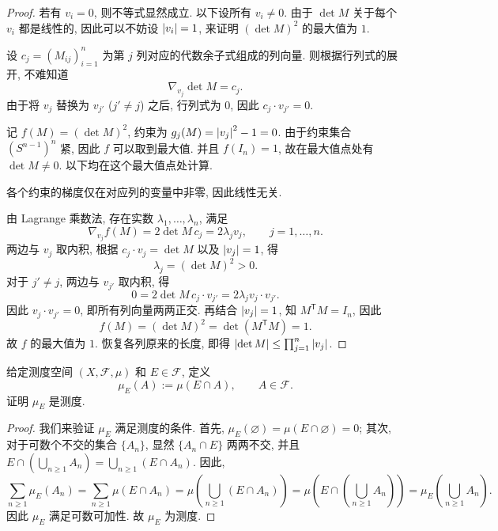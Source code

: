 \documentclass{article}
\begin{document}
\begin{proof}
	若有 $v_i = 0$, 则不等式显然成立. 以下设所有 $v_i \neq 0$. 由于 $\det M$ 关于每个 $v_i$ 都是线性的, 因此可以不妨设 $\left|v_i\right| = 1$, 来证明 $(\det M)^2$ 的最大值为 $1$.

	设 $c_j = (M_{ij})_{i=1}^n$ 为第 $j$ 列对应的代数余子式组成的列向量. 则根据行列式的展开, 不难知道
	\[ \nabla_{v_j}\det M = c_j. \]
	由于将 $v_j$ 替换为 $v_{j'}$ ($j' \neq j$) 之后, 行列式为 $0$, 因此 $c_j \cdot v_{j'} = 0$.

	记 $f(M) = (\det M)^2$, 约束为 $g_j(M) = \left|v_j\right|^2 - 1 = 0$. 由于约束集合 $(S^{n-1})^n$ 紧, 因此 $f$ 可以取到最大值. 并且 $f(I_n) = 1$, 故在最大值点处有 $\det M \neq 0$. 以下均在这个最大值点处计算.

	各个约束的梯度仅在对应列的变量中非零, 因此线性无关.

	由 Lagrange 乘数法, 存在实数 $\lambda_1, \ldots, \lambda_n$, 满足
	\[ \nabla_{v_j} f(M) = 2\det M \, c_j = 2\lambda_j v_j, \qquad j = 1, \ldots, n. \]
	两边与 $v_j$ 取内积, 根据 $c_j \cdot v_j = \det M$ 以及 $\left|v_j\right| = 1$, 得
	\[ \lambda_j = (\det M)^2 > 0. \]
	对于 $j' \neq j$, 两边与 $v_{j'}$ 取内积, 得
	\[ 0 = 2\det M \, c_j \cdot v_{j'} = 2\lambda_j v_j \cdot v_{j'}. \]
	因此 $v_j \cdot v_{j'} = 0$, 即所有列向量两两正交. 再结合 $\left|v_j\right| = 1$, 知 $M^{\mathsf T}M = I_n$, 因此
	\[ f(M) = (\det M)^2 = \det(M^{\mathsf T}M) = 1. \]
	故 $f$ 的最大值为 $1$. 恢复各列原来的长度, 即得 $\left|\det M\right| \le \prod_{j=1}^n \left|v_j\right|$.
\end{proof}



\begin{problem}
  给定测度空间 $(X,\mathcal{F},\mu)$ 和 $E\in\mathcal{F}$, 定义
  \[
    \mu_E(A):=\mu(E\cap A),\qquad A\in\mathcal{F}.
  \]
  证明 $\mu_E$ 是测度.
\end{problem}

\begin{proof}
	我们来验证 $\mu_E$ 满足测度的条件. 首先, $\mu_E(\varnothing) = \mu(E \cap \varnothing) = 0$; 其次, 对于可数个不交的集合 $\{A_n\}$, 显然 $\{A_n \cap E\}$ 两两不交, 并且 $E \cap \left( \bigcup_{n \ge 1}^{}A_n \right) = \bigcup_{n \ge 1}^{}(E \cap A_n)$. 因此, 
	\[ \sum_{n \ge 1}^{}\mu_E(A_n) = \sum_{n \ge 1}^{} \mu(E \cap A_n) = \mu \left( \bigcup_{n \ge 1}^{}(E \cap A_n) \right) = \mu \left( E \cap \left( \bigcup_{n \ge 1}^{}A_n \right) \right) = \mu_E \left( \bigcup_{n \ge 1}^{}A_n \right). \]
	因此 $\mu_E$ 满足可数可加性. 故 $\mu_E$ 为测度.
\end{proof}
\end{document}
